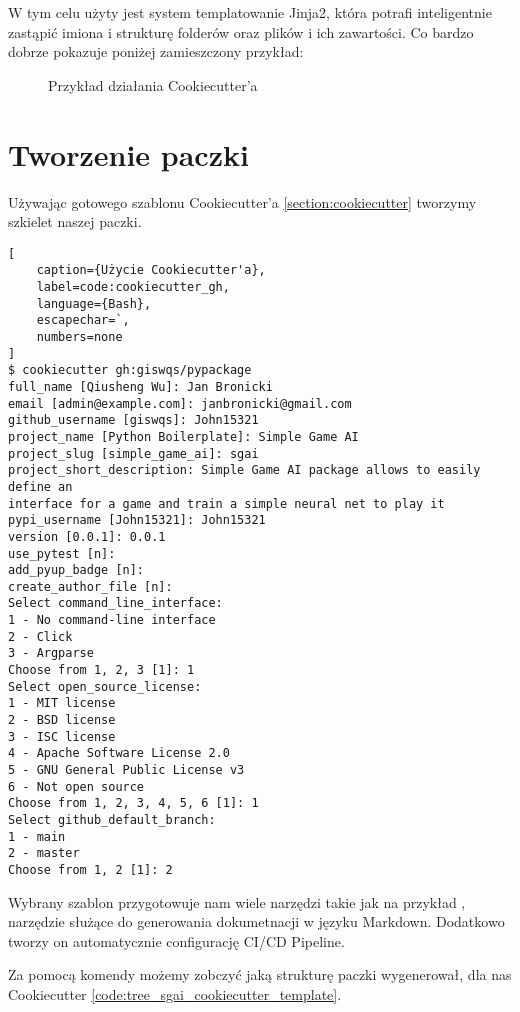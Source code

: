 W tym celu użyty jest system templatowanie Jinja2, która potrafi inteligentnie zastąpić imiona i strukturę folderów oraz plików i ich zawartości. Co bardzo dobrze pokazuje poniżej zamieszczony przykład:

\begin{figure}[h]
    \centering
    \caption{Przykład działania Cookiecutter'a \cite{CookiecutterExample}}
    \label{img:cookiecutter_example}
\end{figure}


\clearpage
\section{Tworzenie paczki}

Używając gotowego szablonu Cookiecutter'a \ref{section:cookiecutter}
\cite{geodemo} tworzymy szkielet naszej paczki.

\begin{onepage}
    \begin{lstlisting}[
    caption={Użycie Cookiecutter'a},
    label=code:cookiecutter_gh,
    language={Bash},
    escapechar=`,
    numbers=none
]
$ cookiecutter gh:giswqs/pypackage
full_name [Qiusheng Wu]: Jan Bronicki
email [admin@example.com]: janbronicki@gmail.com
github_username [giswqs]: John15321
project_name [Python Boilerplate]: Simple Game AI
project_slug [simple_game_ai]: sgai
project_short_description: Simple Game AI package allows to easily define an
interface for a game and train a simple neural net to play it
pypi_username [John15321]: John15321
version [0.0.1]: 0.0.1
use_pytest [n]:
add_pyup_badge [n]:
create_author_file [n]:
Select command_line_interface:
1 - No command-line interface
2 - Click
3 - Argparse
Choose from 1, 2, 3 [1]: 1
Select open_source_license:
1 - MIT license
2 - BSD license
3 - ISC license
4 - Apache Software License 2.0
5 - GNU General Public License v3
6 - Not open source
Choose from 1, 2, 3, 4, 5, 6 [1]: 1
Select github_default_branch:
1 - main
2 - master
Choose from 1, 2 [1]: 2
\end{lstlisting}
\end{onepage}

Wybrany szablon przygotowuje nam wiele narzędzi takie jak na przykład , narzędzie służące do generowania dokumetnacji w języku Markdown.
Dodatkowo tworzy on automatycznie configurację CI/CD Pipeline.

\clearpage

Za pomocą komendy  możemy zobczyć jaką strukturę paczki wygenerował, dla nas Cookiecutter \ref{code:tree_sgai_cookiecutter_template}.

